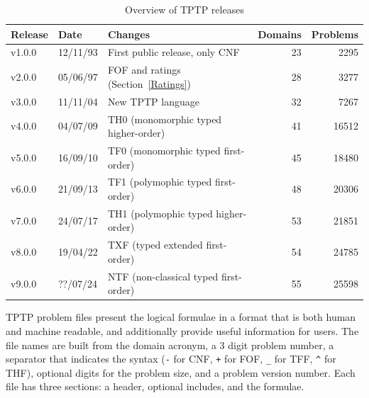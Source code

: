 \documentclass{easychair}
\begin{document}
\begin{table}[htb]
\begin{center}
\setlength{\tabcolsep}{4pt}
\begin{tabular}{ll|l|rr}
Release & Date     & Changes                                              & Domains & Problems \\
\hline
v1.0.0  & 12/11/93 & First public release, only CNF \cite{SS98-JAR}       &      23 &     2295 \\
v2.0.0  & 05/06/97 & FOF \cite{Sut09} and ratings (Section~\ref{Ratings}) &      28 &     3277 \\
v3.0.0  & 11/11/04 & New TPTP language \cite{SS+06}                       &      32 &     7267 \\
v4.0.0  & 04/07/09 & TH0 (monomorphic typed higher-order) \cite{SB10}     &      41 &    16512 \\
v5.0.0  & 16/09/10 & TF0 (monomorphic typed first-order) \cite{SS+12}     &      45 &    18480 \\
v6.0.0  & 21/09/13 & TF1 (polymophic typed first-order) \cite{BP13-TFF1}  &      48 &    20306 \\
v7.0.0  & 24/07/17 & TH1 (polymophic typed higher-order) \cite{KSR16}     &      53 &    21851 \\
v8.0.0  & 19/04/22 & TXF (typed extended first-order) \cite{SK18}         &      54 &    24785 \\
v9.0.0  & ??/07/24 & NTF (non-classical typed first-order) \cite{SF+22}   &      55 &    25598 \\
\end{tabular}
\end{center}
\caption{Overview of TPTP releases}
\label{tab:Releases}
\end{table}

TPTP problem files present the logical formulae in a format that is both human and machine 
readable, and additionally provide useful information for users.
The file names are built from the domain acronym, a 3 digit problem number, a separator that
indicates the syntax ({\tt -} for CNF, {\tt +} for FOF, {\tt \_} for TFF, {\tt \verb|^|} for THF),
optional digits for the problem size, and a problem version number.
Each file has three sections: a header, optional includes, and the formulae.
\end{document}

